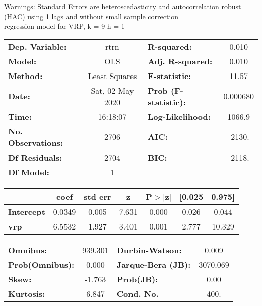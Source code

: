 Warnings: \newline
 [1] Standard Errors are heteroscedasticity and autocorrelation robust (HAC) using 1 lags and without small sample correction\\ 

regression model for VRP, k = 9 h = 1\begin{center}
\begin{tabular}{lclc}
\toprule
\textbf{Dep. Variable:}    &       rtrn       & \textbf{  R-squared:         } &     0.010   \\
\textbf{Model:}            &       OLS        & \textbf{  Adj. R-squared:    } &     0.010   \\
\textbf{Method:}           &  Least Squares   & \textbf{  F-statistic:       } &     11.57   \\
\textbf{Date:}             & Sat, 02 May 2020 & \textbf{  Prob (F-statistic):} &  0.000680   \\
\textbf{Time:}             &     16:18:07     & \textbf{  Log-Likelihood:    } &    1066.9   \\
\textbf{No. Observations:} &        2706      & \textbf{  AIC:               } &    -2130.   \\
\textbf{Df Residuals:}     &        2704      & \textbf{  BIC:               } &    -2118.   \\
\textbf{Df Model:}         &           1      & \textbf{                     } &             \\
\bottomrule
\end{tabular}
\begin{tabular}{lcccccc}
                   & \textbf{coef} & \textbf{std err} & \textbf{z} & \textbf{P$> |$z$|$} & \textbf{[0.025} & \textbf{0.975]}  \\
\midrule
\textbf{Intercept} &       0.0349  &        0.005     &     7.631  &         0.000        &        0.026    &        0.044     \\
\textbf{vrp}       &       6.5532  &        1.927     &     3.401  &         0.001        &        2.777    &       10.329     \\
\bottomrule
\end{tabular}
\begin{tabular}{lclc}
\textbf{Omnibus:}       & 939.301 & \textbf{  Durbin-Watson:     } &    0.009  \\
\textbf{Prob(Omnibus):} &   0.000 & \textbf{  Jarque-Bera (JB):  } & 3070.069  \\
\textbf{Skew:}          &  -1.763 & \textbf{  Prob(JB):          } &     0.00  \\
\textbf{Kurtosis:}      &   6.847 & \textbf{  Cond. No.          } &     400.  \\
\bottomrule
\end{tabular}
\end{center}

